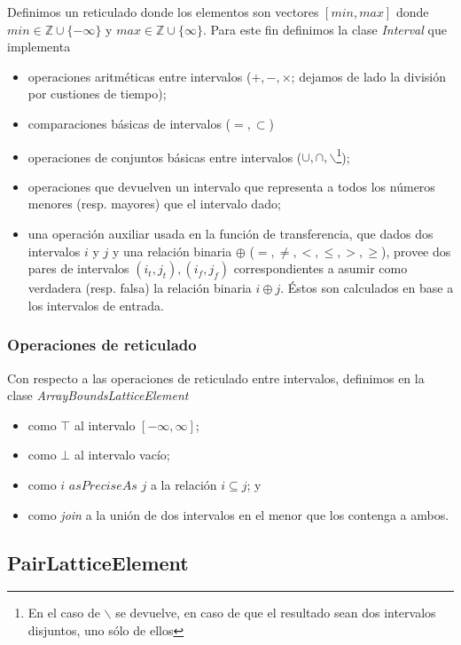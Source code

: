 \documentclass[a4paper]{article}
\begin{document}
Definimos un reticulado donde los elementos son vectores $[min,max]$ donde $min \in \mathbb{Z} \cup \{-\infty\}$ y $max \in \mathbb{Z} \cup \{\infty\}$. Para este fin definimos la clase \emph{Interval} que implementa
\begin{itemize}
\item operaciones aritméticas entre intervalos ($+,-,\times$; dejamos de lado la división por custiones de tiempo);
\item comparaciones básicas de intervalos ($=, \subset$)
\item operaciones de conjuntos básicas entre intervalos ($\cup,\cap, \smallsetminus$\footnote{En el caso de $\smallsetminus$ se devuelve, en caso de que el resultado sean dos intervalos disjuntos, uno sólo de ellos});
\item operaciones que devuelven un intervalo que representa a todos los números menores (resp. mayores) que el intervalo dado;
\item una operación auxiliar usada en la función de transferencia, que dados dos intervalos $i$ y $j$ y una relación binaria $\oplus$ ($=, \neq, <, \leq, >, \geq$), provee dos pares de intervalos $(i_t,j_t),(i_f,j_f)$ correspondientes a asumir como verdadera (resp. falsa) la relación binaria $i \oplus j$. Éstos son calculados en base a los intervalos de entrada.
\end{itemize}

\subsubsection{Operaciones de reticulado}

Con respecto a las operaciones de reticulado entre intervalos, definimos en la clase \emph{ArrayBoundsLatticeElement}

\begin{itemize}
\item como $\top$ al intervalo $[-\infty,\infty]$;
\item como $\bot$ al intervalo vacío;
\item como $i$ $asPreciseAs$ $j$ a la relación $i \subseteq j$; y 
\item como \emph{join} a la unión de dos intervalos en el menor que los contenga a ambos.
\end{itemize}

\subsection{PairLatticeElement}
\end{document}
